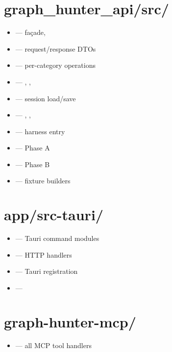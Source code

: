 \section{graph\_hunter\_api/src/}

\begin{itemize}\setlength{\itemsep}{0pt}
    \item {} ---  façade,
    \item {} --- request/response DTOs
    \item {} --- per-category operations
    \item {} --- ,
        , 
    \item {} --- session load/save
    \item {} --- ,
        , 
    \item {} --- harness entry
    \item {} --- Phase A
    \item {} --- Phase B
    \item {} --- fixture builders
\end{itemize}

\section{app/src-tauri/}

\begin{itemize}\setlength{\itemsep}{0pt}
    \item {} --- Tauri command modules
    \item {} --- HTTP handlers
    \item {} --- Tauri  registration
    \item {} --- 
\end{itemize}

\section{graph-hunter-mcp/}

\begin{itemize}\setlength{\itemsep}{0pt}
    \item {} --- all MCP tool handlers
\end{itemize}


